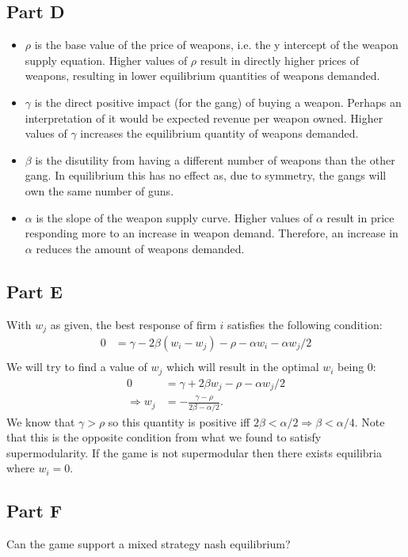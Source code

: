 \documentclass[11pt]{article} %
\begin{document}
\subsection{Part D}
\begin{itemize}
\item
$\rho$ is the base value of the price of weapons, i.e. the y intercept of the weapon supply equation. Higher values of $\rho$ result in directly higher prices of weapons, resulting in lower equilibrium quantities of weapons demanded.
\item
$\gamma$ is the direct positive impact (for the gang) of buying a weapon. Perhaps an interpretation of it would be expected revenue per weapon owned. Higher values of $\gamma$ increases the equilibrium quantity of weapons demanded.
\item
$\beta$ is the disutility from having a different number of weapons than the other gang. In equilibrium this has no effect as, due to symmetry, the gangs will own the same number of guns.
\item
$\alpha$ is the slope of the weapon supply curve. Higher values of $\alpha$ result in price responding more to an increase in weapon demand. Therefore, an increase in $\alpha$ reduces the amount of weapons demanded.
\end{itemize}
\subsection{Part E}
With $w_j$ as given, the best response of firm $i$ satisfies the following condition:
\begin{align*}
0 &= \gamma - 2\beta (w_i - w_j) - \rho -\alpha w_i - \alpha w_j/2\\
\end{align*}
We will try to find a value of $w_j$ which will result in the optimal $w_i$ being $0$:
\begin{align*}
0 &= \gamma +2\beta  w_j - \rho - \alpha w_j/2\\
\Rightarrow w_j &= -\frac{\gamma - \rho}{2\beta - \alpha/2}.
\end{align*}
We know that $\gamma>\rho$ so this quantity is positive iff $2\beta<\alpha/2 \Rightarrow \beta<\alpha/4$. Note that this is the opposite condition from what we found to satisfy supermodularity. If the game is not supermodular then there exists equilibria where $w_i=0.$
\subsection{Part F}
Can the game support a mixed strategy nash equilibrium?
\end{document}
